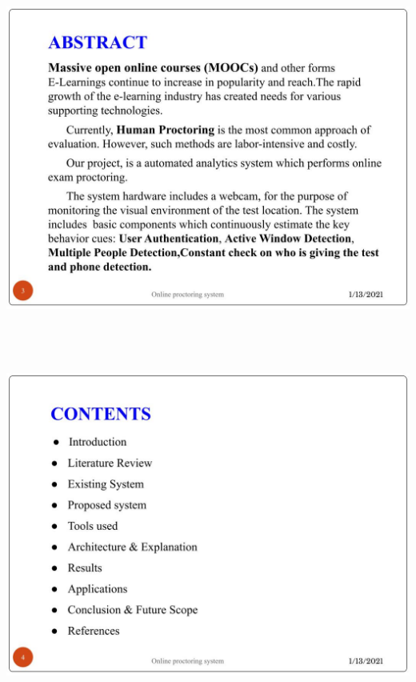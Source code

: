 \documentclass[12pt]{report}
\begin{document}
\includegraphics[width=17cm,height=12cm]{INTERNSHIP SAMPLE PRESENTATION (2)}\\
\includegraphics[width=17cm,height=12cm]{INTERNSHIP SAMPLE PRESENTATION (3)}\\
\end{document}
